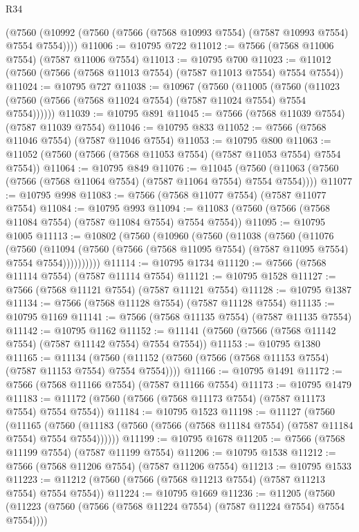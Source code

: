 \begin{lexlean}{R34}
\begin{coremodule}
    (@7560 (@10992 (@7560 (@7566 (@7568 @10993 @7554) (@7587 @10993 @7554) @7554 @7554))))
@11006 := @10795 @722
@11012 := @7566 (@7568 @11006 @7554) (@7587 @11006 @7554)
@11013 := @10795 @700
@11023 := @11012 (@7560 (@7566 (@7568 @11013 @7554) (@7587 @11013 @7554) @7554 @7554))
@11024 := @10795 @727
@11038 := @10967
    (@7560
      (@11005
        (@7560 (@11023 (@7560 (@7566 (@7568 @11024 @7554) (@7587 @11024 @7554) @7554 @7554))))))
@11039 := @10795 @891
@11045 := @7566 (@7568 @11039 @7554) (@7587 @11039 @7554)
@11046 := @10795 @833
@11052 := @7566 (@7568 @11046 @7554) (@7587 @11046 @7554)
@11053 := @10795 @800
@11063 := @11052 (@7560 (@7566 (@7568 @11053 @7554) (@7587 @11053 @7554) @7554 @7554))
@11064 := @10795 @849
@11076 := @11045
    (@7560 (@11063 (@7560 (@7566 (@7568 @11064 @7554) (@7587 @11064 @7554) @7554 @7554))))
@11077 := @10795 @998
@11083 := @7566 (@7568 @11077 @7554) (@7587 @11077 @7554)
@11084 := @10795 @993
@11094 := @11083 (@7560 (@7566 (@7568 @11084 @7554) (@7587 @11084 @7554) @7554 @7554))
@11095 := @10795 @1005
@11113 := @10802
    (@7560
      (@10960
        (@7560
          (@11038
            (@7560
              (@11076
                (@7560
                  (@11094
                    (@7560 (@7566 (@7568 @11095 @7554) (@7587 @11095 @7554) @7554 @7554))))))))))
@11114 := @10795 @1734
@11120 := @7566 (@7568 @11114 @7554) (@7587 @11114 @7554)
@11121 := @10795 @1528
@11127 := @7566 (@7568 @11121 @7554) (@7587 @11121 @7554)
@11128 := @10795 @1387
@11134 := @7566 (@7568 @11128 @7554) (@7587 @11128 @7554)
@11135 := @10795 @1169
@11141 := @7566 (@7568 @11135 @7554) (@7587 @11135 @7554)
@11142 := @10795 @1162
@11152 := @11141 (@7560 (@7566 (@7568 @11142 @7554) (@7587 @11142 @7554) @7554 @7554))
@11153 := @10795 @1380
@11165 := @11134
    (@7560 (@11152 (@7560 (@7566 (@7568 @11153 @7554) (@7587 @11153 @7554) @7554 @7554))))
@11166 := @10795 @1491
@11172 := @7566 (@7568 @11166 @7554) (@7587 @11166 @7554)
@11173 := @10795 @1479
@11183 := @11172 (@7560 (@7566 (@7568 @11173 @7554) (@7587 @11173 @7554) @7554 @7554))
@11184 := @10795 @1523
@11198 := @11127
    (@7560
      (@11165
        (@7560 (@11183 (@7560 (@7566 (@7568 @11184 @7554) (@7587 @11184 @7554) @7554 @7554))))))
@11199 := @10795 @1678
@11205 := @7566 (@7568 @11199 @7554) (@7587 @11199 @7554)
@11206 := @10795 @1538
@11212 := @7566 (@7568 @11206 @7554) (@7587 @11206 @7554)
@11213 := @10795 @1533
@11223 := @11212 (@7560 (@7566 (@7568 @11213 @7554) (@7587 @11213 @7554) @7554 @7554))
@11224 := @10795 @1669
@11236 := @11205
    (@7560 (@11223 (@7560 (@7566 (@7568 @11224 @7554) (@7587 @11224 @7554) @7554 @7554))))

\end{coremodule}
\end{lexlean}
